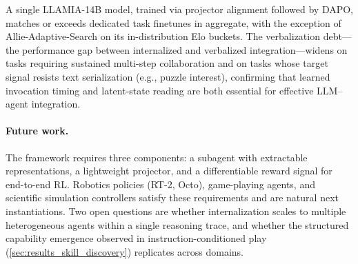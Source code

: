 \documentclass{article}
\theoremstyle{plain}
\theoremstyle{definition}
\theoremstyle{remark}
\theoremstyle{plain}
\theoremstyle{definition}
\theoremstyle{remark}
\begin{document}
A single LLAMIA-14B model, trained via projector alignment followed by DAPO, matches or exceeds dedicated task finetunes in aggregate, with the exception of Allie-Adaptive-Search on its in-distribution Elo buckets. The verbalization debt---the performance gap between internalized and verbalized integration---widens on tasks requiring sustained multi-step collaboration and on tasks whose target signal resists text serialization (e.g., puzzle interest), confirming that learned invocation timing and latent-state reading are both essential for effective LLM--agent integration.

\paragraph{Future work.}
The framework requires three components: a subagent with extractable representations, a lightweight projector, and a differentiable reward signal for end-to-end RL. Robotics policies (RT-2, Octo), game-playing agents, and scientific simulation controllers satisfy these requirements and are natural next instantiations. Two open questions are whether internalization scales to multiple heterogeneous agents within a single reasoning trace, and whether the structured capability emergence observed in instruction-conditioned play (\cref{sec:results_skill_discovery}) replicates across domains.







\newpage
\appendix


\end{document}
